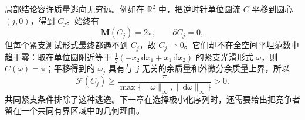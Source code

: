 局部结论容许质量逃向无穷远。例如在 \(\mathbb R^2\) 中，把逆时针单位圆流 \(C\) 平移到圆心 \((j,0)\)，得到 \(C_j\)。始终有
\[
	\mathbf M(C_j)=2\pi,\qquad \partial C_j=0,
\]
但每个紧支测试形式最终都遇不到 \(C_j\)，故 \(C_j\rightharpoonup0\)。它们却不在全空间平坦范数中趋于零：取在单位圆附近等于
\(\tfrac12(-x_2\,\mathrm dx_1+x_1\,\mathrm dx_2)\) 的紧支光滑形式 \(\omega\)，则 \(C(\omega)=\pi\)；平移得到的 \(\omega_j\) 具有与 \(j\) 无关的余质量和外微分余质量上界，所以
\[
	\mathcal F(C_j)\ge
	\frac{\pi}{\max\{\|\omega\|_\infty,\|\mathrm d\omega\|_\infty\}}>0.
\]
共同紧支条件排除了这种逃逸。下一章在选择极小化序列时，还需要给出把竞争者留在一个共同有界区域中的几何理由。
